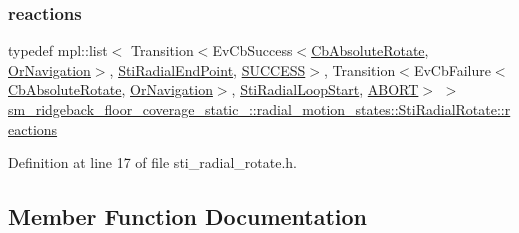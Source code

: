 \subsubsection{\texorpdfstring{reactions}{reactions}}
{\footnotesize\ttfamily typedef mpl\+::list$<$ Transition$<$Ev\+Cb\+Success$<$\hyperlink{classcl__move__base__z_1_1CbAbsoluteRotate}{Cb\+Absolute\+Rotate}, \hyperlink{classsm__ridgeback__floor__coverage__static__1_1_1OrNavigation}{Or\+Navigation}$>$, \hyperlink{structsm__ridgeback__floor__coverage__static__1_1_1radial__motion__states_1_1StiRadialEndPoint}{Sti\+Radial\+End\+Point}, \hyperlink{structsmacc_1_1default__transition__tags_1_1SUCCESS}{S\+U\+C\+C\+E\+SS}$>$, Transition$<$Ev\+Cb\+Failure$<$\hyperlink{classcl__move__base__z_1_1CbAbsoluteRotate}{Cb\+Absolute\+Rotate}, \hyperlink{classsm__ridgeback__floor__coverage__static__1_1_1OrNavigation}{Or\+Navigation}$>$, \hyperlink{structsm__ridgeback__floor__coverage__static__1_1_1radial__motion__states_1_1StiRadialLoopStart}{Sti\+Radial\+Loop\+Start}, \hyperlink{structsmacc_1_1default__transition__tags_1_1ABORT}{A\+B\+O\+RT}$>$ $>$ \hyperlink{structsm__ridgeback__floor__coverage__static__1_1_1radial__motion__states_1_1StiRadialRotate_ab39c52adc47a6cbdb300211ac1b021ff}{sm\+\_\+ridgeback\+\_\+floor\+\_\+coverage\+\_\+static\+\_\+::radial\+\_\+motion\+\_\+states\+::\+Sti\+Radial\+Rotate\+::reactions}}



Definition at line 17 of file sti\+\_\+radial\+\_\+rotate.\+h.



\subsection{Member Function Documentation}
\mbox{\label{structsm__ridgeback__floor__coverage__static__1_1_1radial__motion__states_1_1StiRadialRotate_ac83534973403579c4d7fb390727cbf1d}} 
